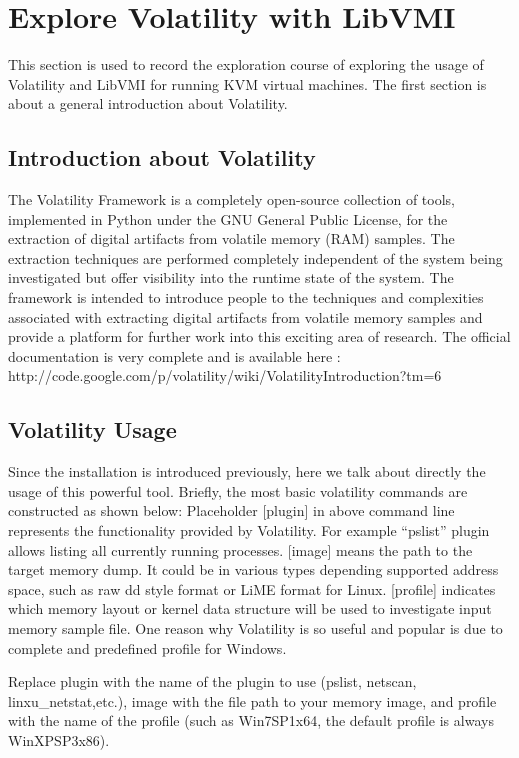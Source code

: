 \section{Explore Volatility with LibVMI}
This section is used to record the exploration course of exploring the usage of Volatility and LibVMI for running KVM virtual machines. 
The first section is about a general introduction about Volatility.
\subsection{Introduction about Volatility}
The Volatility Framework is a completely open-source collection of tools, implemented in Python under the GNU General Public License, 
for the extraction of digital artifacts from volatile memory (RAM) samples. The extraction techniques are performed completely independent 
of the system being investigated but offer visibility into the runtime state of the system. The framework is intended to introduce people 
to the techniques and complexities associated with extracting digital artifacts from volatile memory samples and provide a platform for 
further work into this exciting area of research. The official documentation is very complete and is available here
: http://code.google.com/p/volatility/wiki/VolatilityIntroduction?tm=6
\subsection{Volatility Usage}
Since the installation is introduced previously, here we talk about directly the usage of this powerful tool. Briefly, the most basic 
volatility commands are constructed as shown below:
Placeholder [plugin] in above command line represents the functionality provided by Volatility. For example “pslist” plugin allows listing all 
currently running processes. [image] means the path to the target memory dump. It could be in various types depending supported address 
space, such as raw dd style format or LiME \cite{Reference35} format for Linux. [profile] indicates which memory layout or kernel data structure will 
be used to investigate input memory sample file. One reason why Volatility is so useful and popular is due to complete and predefined 
profile for Windows.

Replace plugin with the name of the plugin to use (pslist, netscan, linxu\_netstat,etc.), image with the file path to your memory image, 
and profile with the name of the profile (such as Win7SP1x64, the default profile is always WinXPSP3x86).

